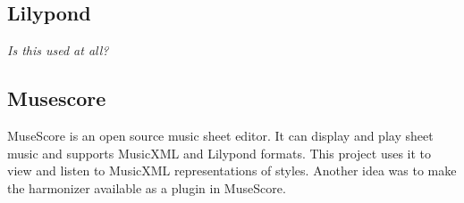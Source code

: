 \subsection{Lilypond}
\label{sec:tools.lilypond}

\textit{Is this used at all?}

\subsection{Musescore}

MuseScore \cite{musescore} is an open source music sheet editor.
It can display and play sheet music and supports MusicXML and Lilypond formats.
This project uses it to view and listen to MusicXML representations of styles.
Another idea was to make the harmonizer available as a plugin in MuseScore.
